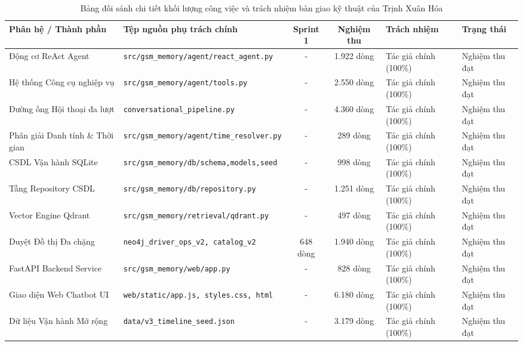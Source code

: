 \documentclass[a4paper,11pt]{article}
\begin{document}
\begin{table}[!htbp]
\centering
\scriptsize
\caption{Bảng đối sánh chi tiết khối lượng công việc và trách nhiệm bàn giao kỹ thuật của Trịnh Xuân Hóa}
\label{tab:sprint2-contributions}
\vspace{0.15cm}
\begin{tabularx}{\textwidth}{>{\raggedright\arraybackslash}p{3.2cm}>{\raggedright\arraybackslash}Xcc>{\raggedright\arraybackslash}p{2.6cm}>{\raggedright\arraybackslash}p{2.0cm}}
\toprule
\textbf{Phân hệ / Thành phần} & \textbf{Tệp nguồn phụ trách chính} & \textbf{Sprint 1} & \textbf{Nghiệm thu} & \textbf{Trách nhiệm} & \textbf{Trạng thái} \\
\midrule
Động cơ ReAct Agent & \nolinkurl{src/gsm_memory/agent/react_agent.py} & - & 1.922 dòng & Tác giả chính (100\%) & Nghiệm thu đạt \\
Hệ thống Công cụ nghiệp vụ & \nolinkurl{src/gsm_memory/agent/tools.py} & - & 2.550 dòng & Tác giả chính (100\%) & Nghiệm thu đạt \\
Đường ống Hội thoại đa lượt & \nolinkurl{conversational_pipeline.py} & - & 4.360 dòng & Tác giả chính (100\%) & Nghiệm thu đạt \\
Phân giải Danh tính \& Thời gian & \nolinkurl{src/gsm_memory/agent/time_resolver.py} & - & 289 dòng & Tác giả chính (100\%) & Nghiệm thu đạt \\
CSDL Vận hành SQLite & \nolinkurl{src/gsm_memory/db/schema,models,seed} & - & 998 dòng & Tác giả chính (100\%) & Nghiệm thu đạt \\
Tầng Repository CSDL & \nolinkurl{src/gsm_memory/db/repository.py} & - & 1.251 dòng & Tác giả chính (100\%) & Nghiệm thu đạt \\
Vector Engine Qdrant & \nolinkurl{src/gsm_memory/retrieval/qdrant.py} & - & 497 dòng & Tác giả chính (100\%) & Nghiệm thu đạt \\
Duyệt Đồ thị Đa chặng & \nolinkurl{neo4j_driver_ops_v2, catalog_v2} & 648 dòng & 1.940 dòng & Tác giả chính (100\%) & Nghiệm thu đạt \\
FastAPI Backend Service & \nolinkurl{src/gsm_memory/web/app.py} & - & 828 dòng & Tác giả chính (100\%) & Nghiệm thu đạt \\
Giao diện Web Chatbot UI & \nolinkurl{web/static/app.js, styles.css, html} & - & 6.180 dòng & Tác giả chính (100\%) & Nghiệm thu đạt \\
Dữ liệu Vận hành Mở rộng & \nolinkurl{data/v3_timeline_seed.json} & - & 3.179 dòng & Tác giả chính (100\%) & Nghiệm thu đạt \\

\end{tabularx}
\end{table}
\end{document}
